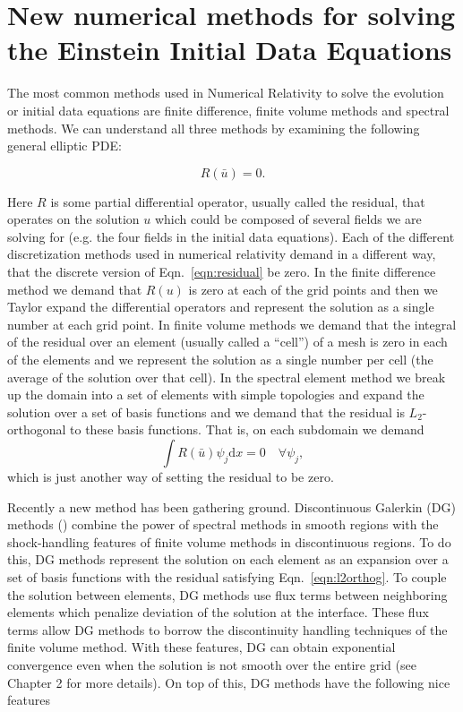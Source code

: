 \section{New numerical methods for solving the Einstein Initial Data Equations}

The most common methods used in Numerical Relativity to solve the evolution or initial data equations are finite difference, finite volume methods and spectral methods. We can understand all three methods by examining the following general elliptic PDE:

\begin{equation}
  \label{eqn:residual}
 R(\bar u) = 0.
\end{equation}

Here $R$ is some partial differential operator, usually called the residual, that operates on the solution $u$ which could be composed of several fields we are solving for (e.g. the four fields in the initial data equations). Each of the different discretization methods used in numerical relativity demand in a different way, that the discrete version of Eqn.~\ref{eqn:residual} be zero. In the finite difference method we demand that $R(u)$ is zero at each of the grid points and then we Taylor expand the differential operators and represent the solution as a single number at each grid point. In finite volume methods we demand that the integral of the residual over an element (usually called a ``cell'') of a mesh is zero in each of the elements and we represent the solution as a single number per cell (the average of the solution over that cell). In the spectral element method we break up the domain into a set of elements with simple topologies and expand the solution over a set of basis functions and we demand that the residual is $L_2$-orthogonal to these basis functions. That is, on each subdomain we demand
%
\begin{equation}
  \label{eqn:l2orthog}
 \int R(\bar u)\psi_j  \mathrm{d}x = 0 \quad \forall \psi_j,
\end{equation}
%
which is just another way of setting the residual to be zero.

Recently a new method has been gathering ground. Discontinuous Galerkin (DG) methods (\cite{hesthaven2008nodal,kidder2016spectre}) combine the power of spectral methods in smooth regions with the shock-handling features of finite volume methods in discontinuous regions. To do this, DG methods represent the solution on each element as an expansion over a set of basis functions with the residual satisfying Eqn.~\ref{eqn:l2orthog}. To couple the solution between elements, DG methods use flux terms between neighboring elements which penalize deviation of the solution at the interface. These flux terms allow DG methods to borrow the discontinuity handling techniques of the finite volume method. With these features, DG can obtain exponential convergence even when the solution is not smooth over the entire grid (see Chapter 2 for more details). On top of this, DG methods have the following nice features

